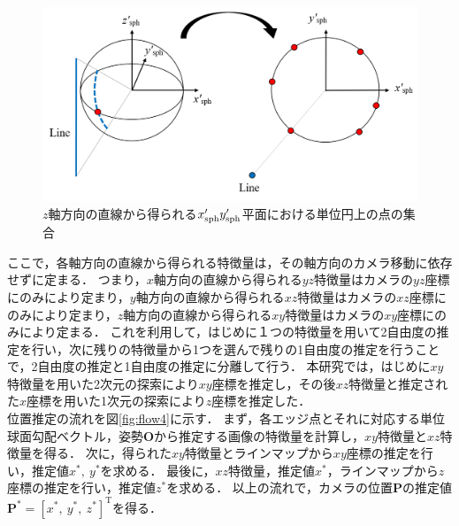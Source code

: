 \clearpage

\begin{figure}[tb]
 \begin{center}
 \includegraphics[width=0.85\columnwidth]{./chap4/fig/feature_z.png}
 \caption{$z$軸方向の直線から得られる$x'_{\rm{sph}}y'_{\rm{sph}}$平面における単位円上の点の集合}
 \label{fig:feature_z}
 \end{center}
\end{figure}


ここで，各軸方向の直線から得られる特徴量は，その軸方向のカメラ移動に依存せずに定まる．
つまり，$x$軸方向の直線から得られる$yz$特徴量はカメラの$yz$座標にのみにより定まり，$y$軸方向の直線から得られる$xz$特徴量はカメラの$xz$座標にのみにより定まり，$z$軸方向の直線から得られる$xy$特徴量はカメラの$xy$座標にのみにより定まる．
これを利用して，はじめに１つの特徴量を用いて2自由度の推定を行い，次に残りの特徴量から1つを選んで残りの1自由度の推定を行うことで，2自由度の推定と1自由度の推定に分離して行う．
本研究では，はじめに$xy$特徴量を用いた2次元の探索により$xy$座標を推定し，その後$xz$特徴量と推定された$x$座標を用いた1次元の探索により$z$座標を推定した．
\\

位置推定の流れを図\ref{fig:flow4}に示す．
まず，各エッジ点とそれに対応する単位球面勾配ベクトル，姿勢$\bm{O}$から推定する画像の特徴量を計算し，$xy$特徴量と$xz$特徴量を得る．
次に，得られた$xy$特徴量とラインマップから$xy$座標の推定を行い，推定値$x^*,\ y^*$を求める．
最後に，$xz$特徴量，推定値$x^*$，ラインマップから$z$座標の推定を行い，推定値$z^*$を求める．
以上の流れで，カメラの位置$\bm{P}$の推定値$\bm{P}^*=[x^*,\ y^*,\ z^*]^{\mathrm{T}}$を得る．


